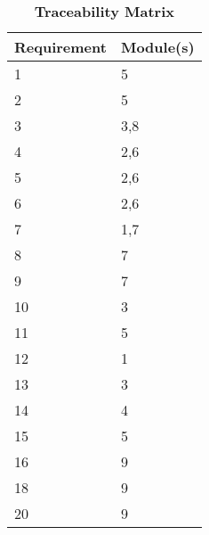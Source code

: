 \documentclass[12pt, titlepage]{article}
\begin{document}
\begin{table}[H]
\caption{\bf Traceability Matrix} \label{tab:reqtrace}
\centering
\begin{tabularx}{0.7\textwidth}{p{4cm}X}
\toprule {\bf Requirement} & {\bf Module(s)}\\
\midrule
1	&	5 \\
2	&	5\\
3	&	3,8\\
4	&	2,6\\
5      &	2,6\\
6	&	2,6\\
7	&	1,7\\
8 	&	7\\
9	&      7\\
10 	&	3\\
11	&	5\\
12	&	1\\
13	&	3\\
14	&	4\\
15	&	5\\
16	&	9\\
18	&	9\\
20	&	9\\



\bottomrule
\end{tabularx}
\end{table}
\end{document}

